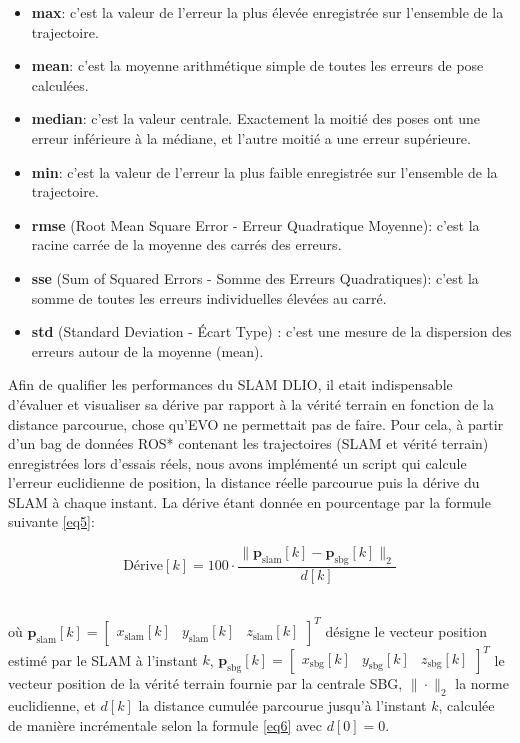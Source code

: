 \begin{itemize}
\renewcommand{\labelitemi}{$\bullet$}
    \item \textbf{max}: c'est la valeur de l'erreur la plus élevée enregistrée sur l'ensemble de la trajectoire.
    \item \textbf{mean}: c'est la moyenne arithmétique simple de toutes les erreurs de pose calculées.
    \item \textbf{median}: c'est la valeur centrale. Exactement la moitié des poses ont une erreur inférieure à la médiane, et l'autre moitié a une erreur supérieure.
    \item \textbf{min}: c'est la valeur de l'erreur la plus faible enregistrée sur l'ensemble de la trajectoire.
    \item \textbf{rmse} (Root Mean Square Error - Erreur Quadratique Moyenne): c'est la racine carrée de la moyenne des carrés des erreurs.
    \item \textbf{sse} (Sum of Squared Errors - Somme des Erreurs Quadratiques): c'est la somme de toutes les erreurs individuelles élevées au carré.
    \item \textbf{std} (Standard Deviation - Écart Type) : c'est une mesure de la dispersion des erreurs autour de la moyenne (mean).\\
\end{itemize}

\indent Afin de qualifier les performances du SLAM DLIO, il etait indispensable d'évaluer et visualiser sa dérive par rapport à la vérité terrain en fonction de la distance parcourue, chose qu'EVO ne permettait pas de faire. Pour cela, à partir d'un bag de données ROS* contenant les trajectoires (SLAM et vérité terrain) enregistrées lors d'essais réels, nous avons implémenté un script qui calcule l'erreur euclidienne de position, la distance réelle parcourue puis la dérive du SLAM à chaque instant. La dérive étant donnée en pourcentage par la formule suivante \eqref{eq5}: 

\begin{equation} \label{eq5}
    \text{Dérive}[k] = 100 \cdot \frac{\|\mathbf{p}_{\text{slam}}[k] - \mathbf{p}_{\text{sbg}}[k]\|_2}{d[k]}
\end{equation}
$\ $

où $\mathbf{p}_{\text{slam}}[k] = \begin{bmatrix} x_{\text{slam}}[k] & y_{\text{slam}}[k] & z_{\text{slam}}[k] \end{bmatrix}^T$ désigne le vecteur position estimé par le SLAM à l'instant $k$, $\mathbf{p}_{\text{sbg}}[k] = \begin{bmatrix} x_{\text{sbg}}[k] & y_{\text{sbg}}[k] & z_{\text{sbg}}[k] \end{bmatrix}^T$ le vecteur position de la vérité terrain fournie par la centrale SBG, $\|\cdot\|_2$ la norme euclidienne, et $d[k]$ la distance cumulée parcourue jusqu'à l'instant $k$, calculée de manière incrémentale selon la formule \eqref{eq6} avec $d[0] = 0$.


